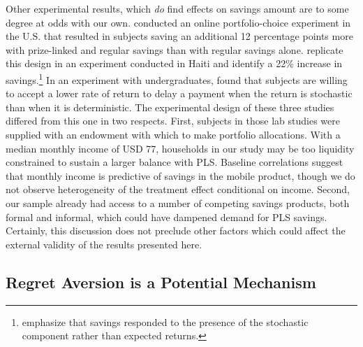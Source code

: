 \documentclass[11pt]{article}
\begin{document}
		Other experimental results, which \emph{do} find effects on savings amount are to some degree at odds with our own. \textcite{atalay_savings_2014} conducted an online portfolio-choice experiment in the U.S. that resulted in subjects saving an additional 12 percentage points more with prize-linked and regular savings than with regular savings alone. \textcite{dizon_leveraging_2016} replicate this design in an experiment conducted in Haiti and identify a 22\% increase in savings.\footnote{\textcite{dizon_leveraging_2016} emphasize that savings responded to the presence of the stochastic component rather than expected returns.} In an experiment with undergraduates, \textcite{filiz-ozbay_lottery_2015} found that subjects are willing to accept a lower rate of return to delay a payment when the return is stochastic than when it is deterministic. The experimental design of these three studies differed from this one in two respects. First, subjects in those lab studies were supplied with an endowment with which to make portfolio allocations. With a median monthly income of USD 77, households in our study may be too liquidity constrained to sustain a larger balance with PLS. Baseline correlations suggest that monthly income is predictive of savings in the mobile product, though we do not observe heterogeneity of the treatment effect conditional on income. Second, our sample already had access to a number of competing savings products, both formal and informal, which could have dampened demand for PLS savings. Certainly, this discussion does not preclude other factors which could affect the external validity of the results presented here.




	\subsection{Regret Aversion is a Potential Mechanism}
\end{document}
